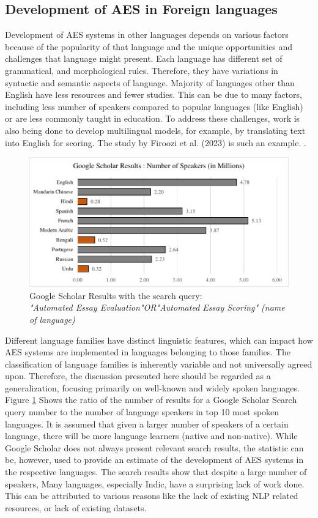 \documentclass{article}
\begin{document}
\subsection{Development of AES in Foreign languages}
Development of AES systems in other languages depends on various factors because of the popularity of that language and the unique opportunities and challenges that language might present. Each language has different set of grammatical, and morphological rules. Therefore, they have variations in syntactic and semantic aspects of language.
Majority of languages other than English have less resources and fewer studies. This can be due to many factors, including less number of speakers compared to popular languages (like English) or are less commonly taught in education.
To address these challenges, work is also being done to develop multilingual models, for example,  by translating text into English for scoring. The study by Firoozi et al. (2023) is such an example. \cite{firoozi2024bert}. 
\begin{figure}
    \centering
    \includegraphics[width=\textwidth]{img/ratio.pdf}
    \caption{Google Scholar Results with the search query: \\
    \textit{"Automated Essay Evaluation"OR"Automated Essay Scoring" (name of language)}}

    \label{searchresult}
\end{figure}
Different language families have distinct linguistic features, which can impact how AES systems are implemented in languages belonging to those families. The classification of language families is inherently variable and not universally agreed upon. Therefore, the discussion presented here should be regarded as a generalization, focusing primarily on well-known and widely spoken languages. \\
Figure \ref{searchresult} Shows the ratio of the number of results for a Google Scholar Search query number to the number of language speakers \cite{wikitotalspeakers} in top 10 most spoken languages. It is assumed that given a larger number of speakers of a certain language, there will be more language learners (native and non-native). While Google Scholar does not always present relevant search results, the statistic can be, however, used to provide an estimate of the development of AES systems in the respective languages. The search results show that despite a large number of speakers, Many languages, especially Indic, have a surprising lack of work done. This can be attributed to various reasons like the lack of existing NLP related resources, or lack of existing datasets. \\
\end{document}
